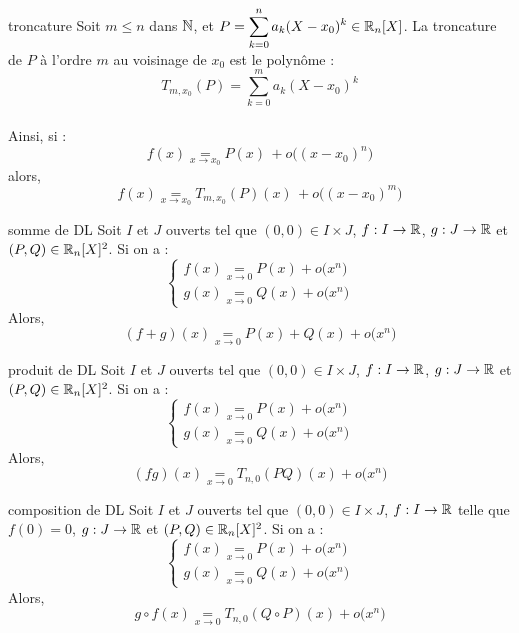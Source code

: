 \begin{adjustwidth}{-3cm}{-3cm}
\begin{definition}{25.46}{troncature}
    Soit $m\leq n$ dans $\mathbb{N}$, et $\displaystyle P = \sum_{k=0}^{n}a_k(X - x_0)^k \in \mathbb{R}_n[X]$. La troncature de $P$ à l'ordre $m$ au voisinage de $x_0$ est le polynôme : 
    $$T_{m,x_0}(P) = \sum_{k=0}^{m}a_k(X - x_0)^k$$\\
    Ainsi, si : 
    $$f(x) \underset{x \to x_0}{=} P(x) \, + o\bigl((x-x_0)^n\bigr)$$
    alors,
    $$f(x) \underset{x \to x_0}{=} T_{m,x_0}(P)(x) \, + o\bigl((x-x_0)^m\bigr)$$
\end{definition}

\begin{proposition}{25.55}{somme de DL}
    Soit $I$ et $J$ ouverts tel que $(0,0) \in I\times J$, $f:I \to \mathbb{R}$,  $g:J \to \mathbb{R}$ et $(P,Q) \in \mathbb{R}_n[X]^2$. Si on a :
    $$\begin{cases}
        f(x) \underset{x \to 0}{=} P(x)  + o\bigl(x^n\bigr)\\
        g(x) \underset{x \to 0}{=} Q(x)  + o\bigl(x^n\bigr)
    \end{cases}$$
    Alors,
    $$(f+g)(x) \underset{x \to 0}{=} P(x) + Q(x) + o\bigl(x^n\bigr)$$
\end{proposition}

\begin{proposition}{25.56}{produit de DL}
    Soit $I$ et $J$ ouverts tel que $(0,0) \in I\times J$, $f:I \to \mathbb{R}$,  $g:J \to \mathbb{R}$ et $(P,Q) \in \mathbb{R}_n[X]^2$. Si on a :
    $$\begin{cases}
        f(x) \underset{x \to 0}{=} P(x)  + o\bigl(x^n\bigr)\\
        g(x) \underset{x \to 0}{=} Q(x)  + o\bigl(x^n\bigr)
    \end{cases}$$
    Alors,
    $$(fg)(x) \underset{x \to 0}{=} T_{n,0}(PQ)(x) + o\bigl(x^n\bigr)$$
\end{proposition}

\begin{proposition}{25.59}{composition de DL}
    Soit $I$ et $J$ ouverts tel que $(0,0) \in I\times J$, $f:I \to \mathbb{R}$ telle que $f(0) = 0$,  $g:J \to \mathbb{R}$ et $(P,Q) \in \mathbb{R}_n[X]^2$. Si on a :
    $$\begin{cases}
        f(x) \underset{x \to 0}{=} P(x)  + o\bigl(x^n\bigr)\\
        g(x) \underset{x \to 0}{=} Q(x)  + o\bigl(x^n\bigr)
    \end{cases}$$
    Alors,
    $$g \circ f(x) \underset{x \to 0}{=} T_{n,0}(Q\circ P)(x) + o\bigl(x^n\bigr)$$
\end{proposition}


\end{adjustwidth}
